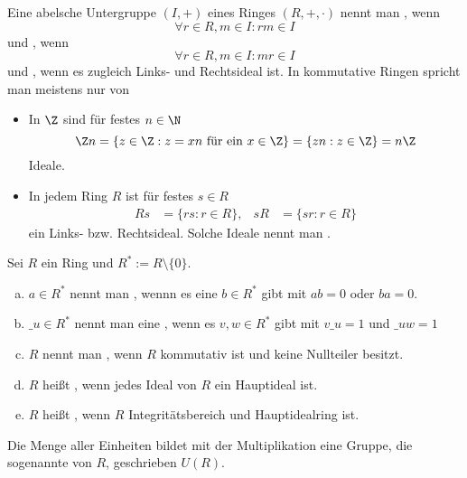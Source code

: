 \begin{df}
	Eine abelsche Untergruppe $(I, +)$ eines Ringes $(R, +, \cdot)$ nennt man , wenn
	\[
		\forall r \in R, m \in I : rm \in I
	\]
	und , wenn
	\[
		\forall r \in R, m \in I : m r \in I
	\]
	und , wenn es zugleich Links- und Rechtsideal ist.
	In kommutative Ringen spricht man meistens nur von 
\end{df}

\begin{ex}
	\begin{itemize}
		\item
			In $\Z$ sind für festes $n \in \N$
			\[
				\Z n = \{ z \in \Z : z = x n \text{ für ein $x \in \Z$} \}
				= \{ z n : z \in \Z \}
				= n \Z
			\]
			Ideale.
		\item
			In jedem Ring $R$ ist für festes $s \in R$
			\begin{align*}
				Rs &= \{ r s : r \in R \}, &
				sR &= \{ sr : r \in R \}
			\end{align*}
			ein Links- bzw. Rechtsideal.
			Solche Ideale nennt man .
	\end{itemize}
\end{ex}

\begin{df}
	Sei $R$ ein Ring und $R^* := R \setminus \{0\}$.
	\begin{enumerate}[a)]
		\item
			$a \in R^*$ nennt man , wennn es eine $b \in R^*$ gibt mit $ab = 0$ oder $ba = 0$.
		\item
			$\_ u \in R^*$ nennt man eine , wenn es $v, w \in R^*$ gibt mit $v \_ u = 1$ und $\_ u w = 1$
		\item
			$R$ nennt man , wenn $R$ kommutativ ist und keine Nullteiler besitzt.
		\item
			$R$ heißt , wenn jedes Ideal von $R$ ein Hauptideal ist.
		\item
			$R$ heißt , wenn $R$ Integritätsbereich und Hauptidealring ist.
	\end{enumerate}
	\begin{note}
		Die Menge aller Einheiten bildet mit der Multiplikation eine Gruppe, die sogenannte  von $R$, geschrieben $U(R)$.
	\end{note}
\end{df}

